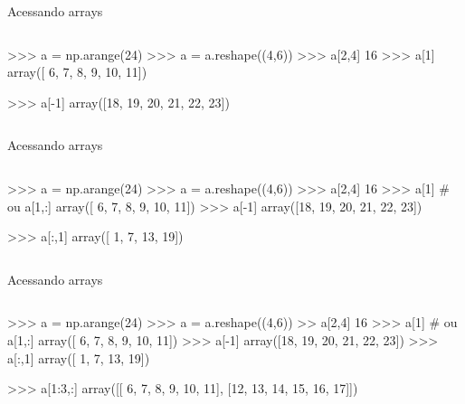 \documentclass[12pt,t,graphics]{beamer}
\begin{document}
\begin{frame}[t,fragile]{Acessando arrays}
	\begin{columns}
		\begin{python}
>>> a = np.arange(24)
>>> a = a.reshape((4,6))
>>> a[2,4]
16
>>> a[1]
array([ 6,  7,  8,  9, 10, 11])
		
>>> a[-1]
array([18, 19, 20, 21, 22, 23])
		\end{python}
	\end{columns}
\end{frame}

\begin{frame}[t,fragile]{Acessando arrays}
	\begin{columns}
		\column{.8\textwidth}
		\begin{python}
>>> a = np.arange(24)
>>> a = a.reshape((4,6))
>>> a[2,4]
16
>>> a[1]  # ou a[1,:]
array([ 6,  7,  8,  9, 10, 11])
>>> a[-1]
array([18, 19, 20, 21, 22, 23])
		
>>> a[:,1]
array([ 1,  7, 13, 19])
		\end{python}
	\end{columns}
\end{frame}

\begin{frame}[t,fragile]{Acessando arrays}
	\begin{columns}
		\begin{python}
>>> a = np.arange(24)
>>> a = a.reshape((4,6))
>> a[2,4]
16
>>> a[1]  # ou a[1,:]
array([ 6,  7,  8,  9, 10, 11])
>>> a[-1]
array([18, 19, 20, 21, 22, 23])
>>> a[:,1]
array([ 1,  7, 13, 19])
		
>>> a[1:3,:]
array([[ 6,  7,  8,  9, 10, 11],
[12, 13, 14, 15, 16, 17]])		
		\end{python}
	\end{columns}
\end{frame}
\end{document}
